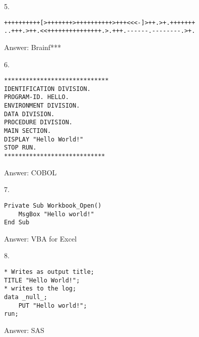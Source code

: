 \documentclass{article}
\begin{document}
\hrulefill
\begin{multicols}{2}


5.
\begin{verbatim}
++++++++++[>+++++++>++++++++++>+++<<<-]>++.>+.+++++++
..+++.>++.<<+++++++++++++++.>.+++.------.--------.>+.
\end{verbatim}

\columnbreak

\begin{flushright}
    Answer: Brainf***
\end{flushright}

\end{multicols}

\hrulefill
\begin{multicols}{2}


6.
\begin{verbatim}
*****************************
IDENTIFICATION DIVISION.
PROGRAM-ID. HELLO.
ENVIRONMENT DIVISION.
DATA DIVISION.
PROCEDURE DIVISION.
MAIN SECTION.
DISPLAY "Hello World!"
STOP RUN.
****************************
\end{verbatim}

\columnbreak

\begin{flushright}
    Answer: COBOL
\end{flushright}

\end{multicols}

\hrulefill
\begin{multicols}{2}


7.
\begin{verbatim}
Private Sub Workbook_Open()
    MsgBox "Hello world!"
End Sub
\end{verbatim}

\columnbreak

\begin{flushright}
    Answer: VBA for Excel
\end{flushright}

\end{multicols}

\hrulefill
\begin{multicols}{2}


8.
\begin{verbatim}
* Writes as output title;
TITLE "Hello World!";
* writes to the log;
data _null_;
    PUT "Hello world!";
run;
\end{verbatim}

\columnbreak

\begin{flushright}
    Answer: SAS
\end{flushright}

\end{multicols}
\end{document}
